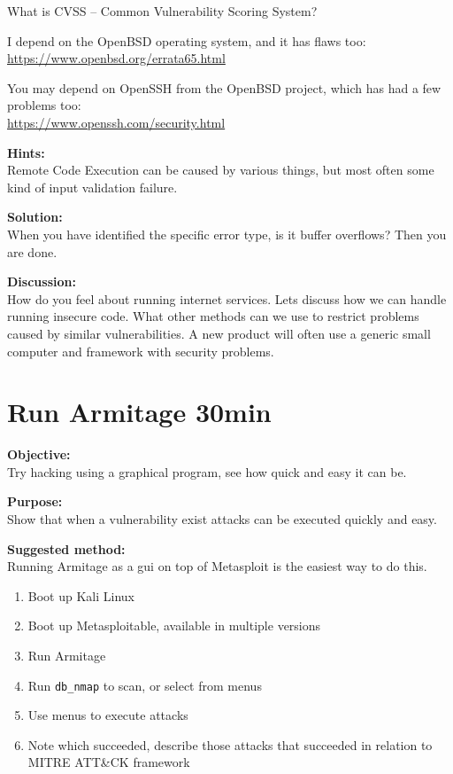 \documentclass[a4paper,11pt,notitlepage]{report}
\begin{document}
What is CVSS -- Common Vulnerability Scoring System?

I depend on the OpenBSD operating system, and it has flaws too:\\
\url{https://www.openbsd.org/errata65.html}

You may depend on OpenSSH from the OpenBSD project, which has had a few problems too:\\
\url{https://www.openssh.com/security.html}

{\bf Hints:}\\
Remote Code Execution can be caused by various things, but most often some kind of input validation failure.

{\bf Solution:}\\
When you have identified the specific error type, is it buffer overflows? Then you are done.

{\bf Discussion:}\\
How do you feel about running internet services. Lets discuss how we can handle running insecure code.
What other methods can we use to restrict problems caused by similar vulnerabilities.
A new product will often use a generic small computer and framework with security problems.

\chapter{Run Armitage 30min}
\label{ex:armitage-basic}

{\bf Objective:}\\
Try hacking using a graphical program, see how quick and easy it can be.

{\bf Purpose:}\\
Show that when a vulnerability exist attacks can be executed quickly and easy.

{\bf Suggested method:}\\

Running Armitage as a gui on top of Metasploit is the easiest way to do this.

\begin{enumerate}
\item Boot up Kali Linux
\item Boot up Metasploitable, available in multiple versions
\item Run Armitage
\item Run \verb+db_nmap+ to scan, or select from menus
\item Use menus to execute attacks
\item Note which succeeded, describe those attacks that succeeded in relation to MITRE ATT\&CK framework
\end{enumerate}
\end{document}
